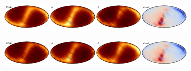 \documentclass{aa}
\begin{document}
\begin{figure}
    \includegraphics[width=0.22\textwidth]{figs/zodi/zodi_06_tot.pdf}\includegraphics[width=0.22\textwidth]{figs/zodi/zodi_06_a.pdf}\includegraphics[width=0.22\textwidth]{figs/zodi/zodi_05_b.pdf}\includegraphics[width=0.22\textwidth]{figs/zodi/zodi_06_a-b.pdf}
    \vspace{-0.3cm}

    \includegraphics[width=0.22\textwidth]{figs/zodi/zodi_05_tot.pdf}\includegraphics[width=0.22\textwidth]{figs/zodi/zodi_05_a.pdf}\includegraphics[width=0.22\textwidth]{figs/zodi/zodi_06_b.pdf}\includegraphics[width=0.22\textwidth]{figs/zodi/zodi_05_a-b.pdf}
    \vspace{-0.3cm}


\end{figure}
\end{document}
